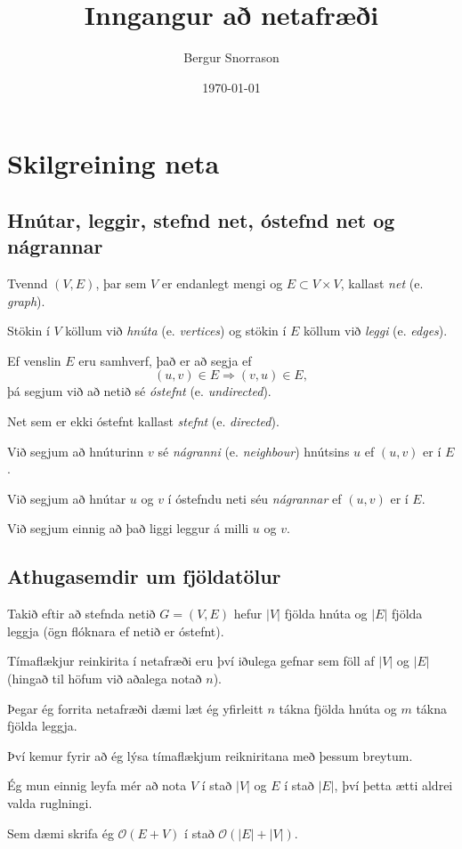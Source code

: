 \title{Inngangur að netafræði}
\author{Bergur Snorrason}
\date{\today}



\frame{\titlepage}

\section{Skilgreining neta}
\subsection{Hnútar, leggir, stefnd net, óstefnd net og nágrannar}
{
    {
        \item<1-> Tvennd $(V, E)$, þar sem $V$ er endanlegt mengi og $E \subset V \times V$, kallast \emph{net} (e. \emph{graph}).
        \item<2-> Stökin í $V$ köllum við \emph{hnúta} (e. \emph{vertices}) og stökin í $E$ köllum við \emph{leggi} (e. \emph{edges}).
        \item<3-> Ef venslin $E$ eru samhverf, það er að segja ef 
            \[
                (u, v) \in E \Rightarrow (v, u) \in E,
            \]
            þá segjum við að netið sé \emph{óstefnt} (e. \emph{undirected}).
        \item<4-> Net sem er ekki óstefnt kallast \emph{stefnt} (e. \emph{directed}).
        \item<5-> Við segjum að hnúturinn $v$ sé \emph{nágranni} (e. \emph{neighbour}) hnútsins $u$ ef $(u, v)$ er í $E$.
        \item<6-> Við segjum að hnútar $u$ og $v$ í óstefndu neti séu \emph{nágrannar} ef $(u, v)$ er í $E$.
        \item<7-> Við segjum einnig að það liggi leggur á milli $u$ og $v$.
    }
}

\subsection{Athugasemdir um fjöldatölur}
{
    {
        \item<1-> Takið eftir að stefnda netið $G = (V, E)$ hefur $|V|$ fjölda hnúta og $|E|$ fjölda leggja (ögn flóknara ef netið er óstefnt).
        \item<2-> Tímaflækjur reinkirita í netafræði eru því iðulega gefnar sem föll af $|V|$ og $|E|$ (hingað til höfum við aðalega notað $n$).
        \item<3-> Þegar ég forrita netafræði dæmi læt ég yfirleitt $n$ tákna fjölda hnúta og $m$ tákna fjölda leggja.
        \item<4-> Því kemur fyrir að ég lýsa tímaflækjum reikniritana með þessum breytum.
        \item<5-> Ég mun einnig leyfa mér að nota $V$ í stað $|V|$ og $E$ í stað $|E|$, því þetta ætti aldrei valda ruglningi.
        \item<6-> Sem dæmi skrifa ég $\mathcal{O}(E + V)$ í stað $\mathcal{O}(|E| + |V|)$.
    }
}

